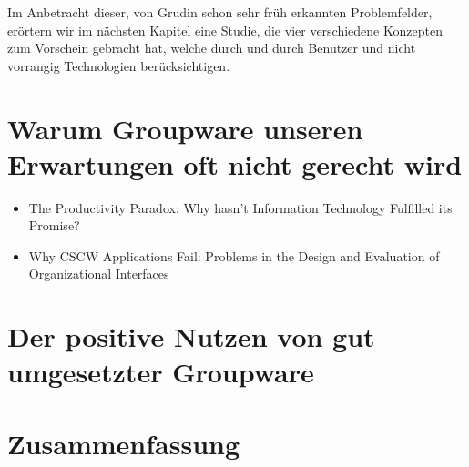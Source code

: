 \medskip Im Anbetracht dieser, von Grudin schon sehr früh erkannten Problemfelder, erörtern wir im nächsten Kapitel eine Studie, die vier verschiedene Konzepten zum Vorschein gebracht hat, welche durch und durch Benutzer und nicht vorrangig Technologien berücksichtigen.

\section{Warum Groupware unseren Erwartungen oft nicht gerecht wird}
\begin{itemize}
	\item {The Productivity Paradox: Why hasn't Information Technology Fulfilled its Promise?}
	\item {Why CSCW Applications Fail: Problems in the Design and Evaluation of Organizational Interfaces}
\end{itemize}

\section{Der positive Nutzen von gut umgesetzter Groupware}

\section*{Zusammenfassung}